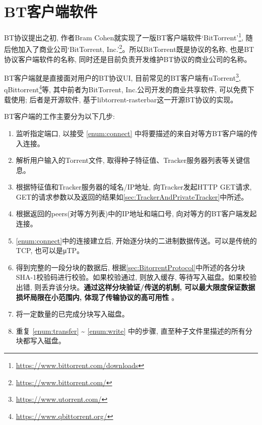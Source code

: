 \section{BT客户端软件}

BT协议提出之初, 作者Bram Cohen就实现了一版BT客户端软件`BitTorrent'\footnote{\url{https://www.bittorrent.com/downloads}}, 随后他加入了商业公司`BitTorrent, Inc.'\footnote{\url{https://www.bittorrent.com/}}。所以BitTorrent既是协议的名称, 也是BT协议客户端软件的名称, 同时还是目前负责开发维护BT协议的商业公司的名称。

BT客户端就是直接面对用户的BT协议UI, 目前常见的BT客户端有uTorrent\footnote{\url{https://www.utorrent.com/}}, qBittorrent\footnote{\url{https://www.qbittorrent.org/}}等, 其中前者为BitTorrent, Inc.公司开发的商业共享软件, 可以免费下载使用; 后者是开源软件, 基于libtorrent-rasterbar这一开源BT协议的实现。

BT客户端的工作主要分为以下几步:

\begin{enumerate}[label=(\arabic*),leftmargin=*]
\item 监听指定端口, 以接受 \ref{enum:connect} 中将要描述的来自对等方BT客户端的传入连接。

\item 解析用户输入的Torrent文件, 取得种子特征值、Tracker服务器列表等关键信息。

\item 根据特征值和Tracker服务器的域名/IP地址, 向Tracker发起HTTP GET请求, GET的请求参数以及返回的结果如\ref{sec:TrackerAndPrivateTracker}中所述。

\item \label{enum:connect}根据返回的peers(对等方列表)中的IP地址和端口号, 向对等方的BT客户端发起连接。

\item \label{enum:transfer} \ref{enum:connect}中的连接建立后, 开始逐分块的二进制数据传送。可以是传统的TCP, 也可以是μTP。

\item 得到完整的一段分块的数据后, 根据\ref{sec:BitorrentProtocol}中所述的各分块SHA-1校验码进行校验。如果校验通过, 则放入缓存, 等待写入磁盘。如果校验出错, 则丢弃该分块。\textbf{通过这样分块验证/传送的机制, 可以最大限度保证数据损坏局限在小范围内, 体现了传输协议的高可用性}
。

\item \label{enum:write}将一定数量的已完成分块写入磁盘。

\item 重复 \ref{enum:transfer} \~{} \ref{enum:write} 中的步骤, 直至种子文件里描述的所有分块都写入磁盘。
\end{enumerate}




